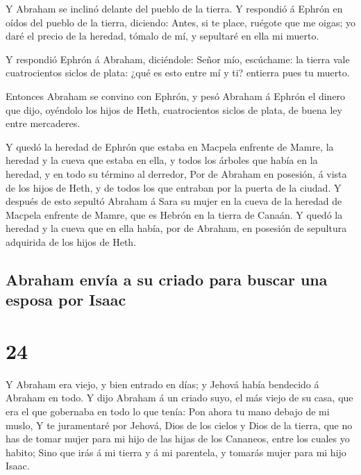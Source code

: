  Y Abraham se inclinó delante del pueblo de la tierra.
 Y respondió á Ephrón en oídos del pueblo de la tierra,
diciendo: Antes, si te place, ruégote que me oigas; yo daré el precio de
la heredad, tómalo de mí, y sepultaré en ella mi muerto.

 Y respondió Ephrón á Abraham, diciéndole:
 Señor mío, escúchame: la tierra vale cuatrocientos
siclos de plata: ¿qué es esto entre mí y ti? entierra pues tu muerto.

 Entonces Abraham se convino con Ephrón, y pesó Abraham á
Ephrón el dinero que dijo, oyéndolo los hijos de Heth, cuatrocientos
siclos de plata, de buena ley entre mercaderes.

 Y quedó la heredad de Ephrón que estaba en Macpela
enfrente de Mamre, la heredad y la cueva que estaba en ella, y todos los
árboles que había en la heredad, y en todo su término al derredor,
 Por de Abraham en posesión, á vista de los hijos de
Heth, y de todos los que entraban por la puerta de la ciudad.
 Y después de esto sepultó Abraham á Sara su mujer en la
cueva de la heredad de Macpela enfrente de Mamre, que es Hebrón en la
tierra de Canaán.  Y quedó la heredad y la cueva que en
ella había, por de Abraham, en posesión de sepultura adquirida de los
hijos de Heth.

\hypertarget{abraham-envuxeda-a-su-criado-para-buscar-una-esposa-por-isaac}{%
\subsection{Abraham envía a su criado para buscar una esposa por
Isaac}\label{abraham-envuxeda-a-su-criado-para-buscar-una-esposa-por-isaac}}

\hypertarget{section-01-24}{%
\section{24}\label{section-01-24}}

 Y Abraham era viejo, y bien entrado en días; y Jehová
había bendecido á Abraham en todo.  Y dijo Abraham á un
criado suyo, el más viejo de su casa, que era el que gobernaba en todo
lo que tenía: Pon ahora tu mano debajo de mi muslo,  Y te
juramentaré por Jehová, Dios de los cielos y Dios de la tierra, que no
has de tomar mujer para mi hijo de las hijas de los Cananeos, entre los
cuales yo habito;  Sino que irás á mi tierra y á mi
parentela, y tomarás mujer para mi hijo Isaac.

